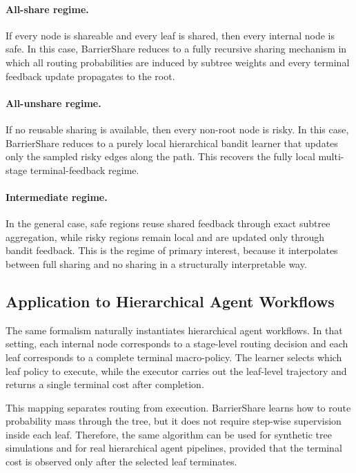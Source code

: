 \documentclass{article}
\begin{document}
\paragraph{All-share regime.}
If every node is shareable and every leaf is shared, then every internal node is safe. In this case, BarrierShare reduces to a fully recursive sharing mechanism in which all routing probabilities are induced by subtree weights and every terminal feedback update propagates to the root.

\paragraph{All-unshare regime.}
If no reusable sharing is available, then every non-root node is risky. In this case, BarrierShare reduces to a purely local hierarchical bandit learner that updates only the sampled risky edges along the path. This recovers the fully local multi-stage terminal-feedback regime.

\paragraph{Intermediate regime.}
In the general case, safe regions reuse shared feedback through exact subtree aggregation, while risky regions remain local and are updated only through bandit feedback. This is the regime of primary interest, because it interpolates between full sharing and no sharing in a structurally interpretable way.

\subsection{Application to Hierarchical Agent Workflows}
\label{sec:barriershare_agent_instantiation}

The same formalism naturally instantiates hierarchical agent workflows. In that setting, each internal node corresponds to a stage-level routing decision and each leaf corresponds to a complete terminal macro-policy. The learner selects which leaf policy to execute, while the executor carries out the leaf-level trajectory and returns a single terminal cost after completion.

This mapping separates routing from execution. BarrierShare learns how to route probability mass through the tree, but it does not require step-wise supervision inside each leaf. Therefore, the same algorithm can be used for synthetic tree simulations and for real hierarchical agent pipelines, provided that the terminal cost is observed only after the selected leaf terminates.
\end{document}
